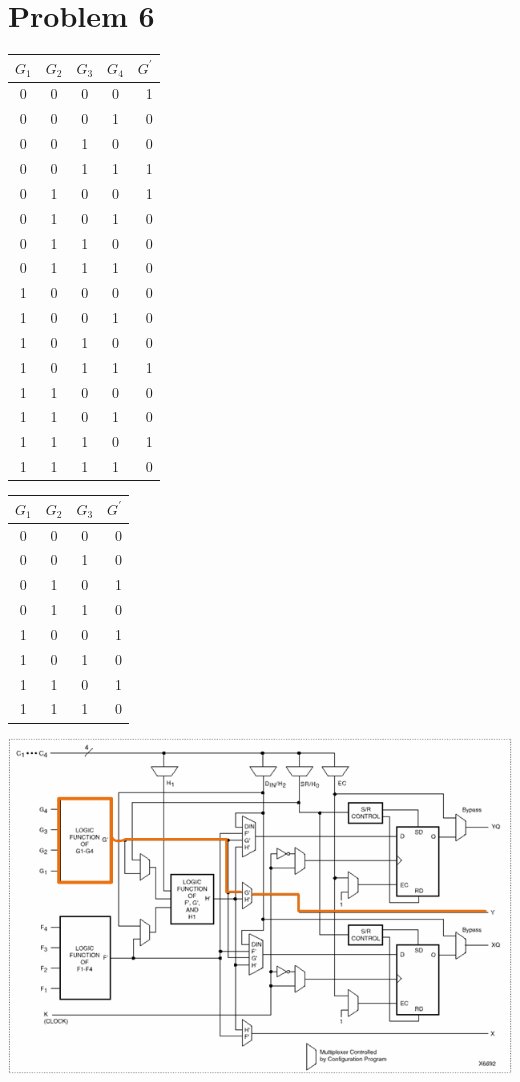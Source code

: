 \documentclass[paper=a4, fontsize=11pt]{scrartcl} %
\numberwithin{equation}{section} %
\numberwithin{figure}{section} %
\numberwithin{table}{section} %
\begin{document}
\section{Problem 6}
\begin{center}
	\begin{tabular}{c | c | c | c || r}
		$G_1$ & $G_2$ & $G_3$ & $G_4$ & $G^\prime$ \\
		\hline
		0 & 0 & 0 & 0 & 1\\
		\hline
		0 & 0 & 0 & 1 & 0 \\
		\hline
		0 & 0 & 1 & 0 & 0 \\
		\hline
		0 & 0 & 1 & 1 & 1 \\
		\hline
		0 & 1 & 0 & 0 & 1 \\
		\hline
		0 & 1 & 0 & 1 & 0 \\
		\hline
		0 & 1 & 1 & 0 & 0 \\
		\hline
		0 & 1 & 1 & 1 & 0 \\
		\hline
		1 & 0 & 0 & 0 & 0 \\
		\hline
		1 & 0 & 0 & 1 & 0 \\
		\hline
		1 & 0 & 1 & 0 & 0 \\
		\hline
		1 & 0 & 1 & 1 & 1 \\
		\hline
		1 & 1 & 0 & 0 & 0 \\
		\hline
		1 & 1 & 0 & 1 & 0 \\
		\hline
		1 & 1 & 1 & 0 & 1 \\
		\hline
		1 & 1 & 1 & 1 & 0 \\
		\hline
	\end{tabular}
\end{center}
\begin{center}
	\begin{tabular}{c | c | c || r}
		$G_1$ & $G_2$ & $G_3$ & $G^\prime$ \\
		\hline
		0 & 0 & 0 & 0 \\
		\hline
		0 & 0 & 1 & 0 \\
		\hline
		0 & 1 & 0 & 1 \\
		\hline
		0 & 1 & 1 & 0 \\
		\hline
		1 & 0 & 0 & 1 \\
		\hline
		1 & 0 & 1 & 0 \\
		\hline
		1 & 1 & 0 & 1 \\
		\hline
		1 & 1 & 1 & 0 \\
		\hline
	\end{tabular}
\end{center}

\center\includegraphics[]{p6.png}\\
\end{document}
